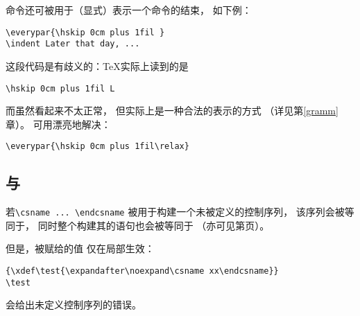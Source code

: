 \documentclass{book}
\begin{document}
命令还可被用于（显式）表示一个命令的结束，
如下例\label{fil:l:l}：
\begin{verbatim}
\everypar{\hskip 0cm plus 1fil }
\indent Later that day, ... 
\end{verbatim}
这段代码是有歧义的：{\TeX}实际上读到的是
\begin{verbatim}
\hskip 0cm plus 1fil L
\end{verbatim}
而\hbox{}虽然看起来不太正常，
但实际上是一种合法的表示的方式
（详见第\ref{gramm}章）。
可用漂亮地解决：
\begin{verbatim}
\everypar{\hskip 0cm plus 1fil\relax}
\end{verbatim}

\subsection{与}
\label{relax:cs}

若\verb-\csname ... \endcsname-
被用于构建一个未被定义的控制序列，
该序列会被等同于，
同时整个构建其的语句也会被等同于
（亦可见第\pageref{cs:name}页）。

但是，被赋给的值
\altt
仅在局部生效：
\begin{verbatim}
{\xdef\test{\expandafter\noexpand\csname xx\endcsname}}
\test
\end{verbatim}
会给出未定义控制序列的错误。
\end{document}
